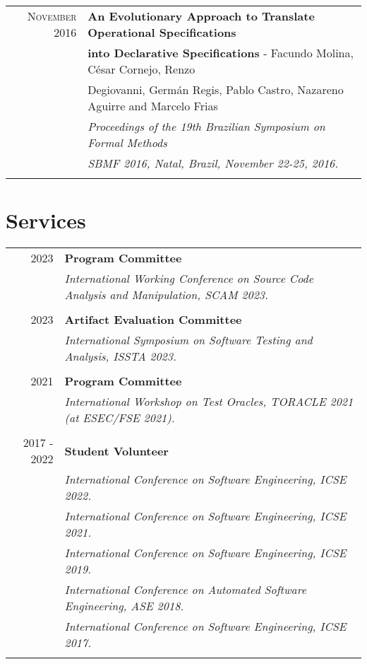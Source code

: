 \documentclass[a4paper,10pt]{article} %
\begin{document}
\begin{longtable}{rl}
\textsc{November} 2016 & \textbf{An Evolutionary Approach to Translate Operational Specifications} \\ & \textbf{into Declarative Specifications} - Facundo Molina, César Cornejo, Renzo \\
& Degiovanni, Germán Regis, Pablo Castro, Nazareno Aguirre and Marcelo Frias \\
& \textit{Proceedings of the 19th Brazilian Symposium on Formal Methods} \\ 
& \textit{SBMF 2016, Natal, Brazil, November 22-25, 2016.} \\ & \\

\end{longtable}

\section{Services}
\begin{longtable}{rl}

\textsc{2023}   & \textbf{Program Committee} \\
& \textit{International Working Conference on Source Code Analysis and Manipulation, SCAM 2023.} \\ & \\

\textsc{2023} & \textbf{Artifact Evaluation Committee} \\
& \textit{International Symposium on Software Testing and Analysis, ISSTA 2023.} \\ & \\

\textsc{2021}   & \textbf{Program Committee} \\
& \textit{International Workshop on Test Oracles, TORACLE 2021 (at ESEC/FSE 2021).} \\ & \\

\textsc{2017 - 2022} & \textbf{Student Volunteer} \\
& \textit{International Conference on Software Engineering, ICSE 2022.} \\
& \textit{International Conference on Software Engineering, ICSE 2021.} \\
& \textit{International Conference on Software Engineering, ICSE 2019.} \\
& \textit{International Conference on Automated Software Engineering, ASE 2018.} \\
& \textit{International Conference on Software Engineering, ICSE 2017.} \\ & \\

\end{longtable}
\end{document}
